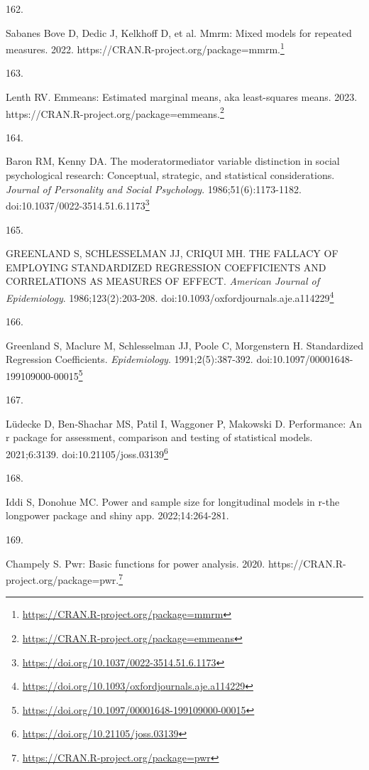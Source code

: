 \documentclass[
  a4paper,
]{book}
\newlength{\cslhangindent}
\newlength{\csllabelwidth}
\newlength{\cslentryspacingunit} %
\newenvironment{CSLReferences}[2] %
 {%
  \setlength{\parindent}{0pt}
  \ifodd #1
  \let\oldpar\par
  \def\par{\hangindent=\cslhangindent\oldpar}
  \fi
  \setlength{\parskip}{#2\cslentryspacingunit}
 }%
 {}
\newcommand{\CSLLeftMargin}[1]{\parbox[t]{\csllabelwidth}{#1}}
\newcommand{\CSLRightInline}[1]{\parbox[t]{\linewidth - \csllabelwidth}{#1}\break}
\renewcommand{\href}[2]{#2\footnote{\url{#1}}}
\begin{document}
\begin{CSLReferences}{0}{0}
\leavevmode{}%
\CSLLeftMargin{162. }%
\CSLRightInline{Sabanes Bove D, Dedic J, Kelkhoff D, et al. Mmrm: Mixed models for repeated measures. 2022. \href{https://CRAN.R-project.org/package=mmrm}{https://CRAN.R-project.org/package=mmrm.}}

\leavevmode{}%
\CSLLeftMargin{163. }%
\CSLRightInline{Lenth RV. Emmeans: Estimated marginal means, aka least-squares means. 2023. \href{https://CRAN.R-project.org/package=emmeans}{https://CRAN.R-project.org/package=emmeans.}}

\leavevmode{}%
\CSLLeftMargin{164. }%
\CSLRightInline{Baron RM, Kenny DA. The moderator{\textendash}mediator variable distinction in social psychological research: Conceptual, strategic, and statistical considerations. \emph{Journal of Personality and Social Psychology}. 1986;51(6):1173-1182. doi:\href{https://doi.org/10.1037/0022-3514.51.6.1173}{10.1037/0022-3514.51.6.1173}}

\leavevmode{}%
\CSLLeftMargin{165. }%
\CSLRightInline{GREENLAND S, SCHLESSELMAN JJ, CRIQUI MH. THE FALLACY OF EMPLOYING STANDARDIZED REGRESSION COEFFICIENTS AND CORRELATIONS AS MEASURES OF EFFECT. \emph{American Journal of Epidemiology}. 1986;123(2):203-208. doi:\href{https://doi.org/10.1093/oxfordjournals.aje.a114229}{10.1093/oxfordjournals.aje.a114229}}

\leavevmode{}%
\CSLLeftMargin{166. }%
\CSLRightInline{Greenland S, Maclure M, Schlesselman JJ, Poole C, Morgenstern H. Standardized Regression Coefficients. \emph{Epidemiology}. 1991;2(5):387-392. doi:\href{https://doi.org/10.1097/00001648-199109000-00015}{10.1097/00001648-199109000-00015}}

\leavevmode{}%
\CSLLeftMargin{167. }%
\CSLRightInline{Lüdecke D, Ben-Shachar MS, Patil I, Waggoner P, Makowski D. {\textbraceleft}Performance{\textbraceright}: An {\textbraceleft}r{\textbraceright} package for assessment, comparison and testing of statistical models. 2021;6:3139. doi:\href{https://doi.org/10.21105/joss.03139}{10.21105/joss.03139}}

\leavevmode{}%
\CSLLeftMargin{168. }%
\CSLRightInline{Iddi S, Donohue MC. Power and sample size for longitudinal models in r-the longpower package and shiny app. 2022;14:264-281.}

\leavevmode{}%
\CSLLeftMargin{169. }%
\CSLRightInline{Champely S. Pwr: Basic functions for power analysis. 2020. \href{https://CRAN.R-project.org/package=pwr}{https://CRAN.R-project.org/package=pwr.}}


\end{CSLReferences}
\end{document}

